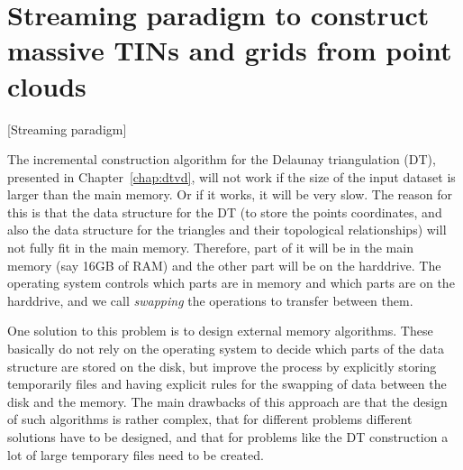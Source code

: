 

%
\section[Streaming paradigm to construct massive TINs/grids]{Streaming paradigm to construct massive TINs and grids from point clouds}[Streaming paradigm]%
\label{sec:streaming}

The incremental construction algorithm for the Delaunay triangulation (DT), presented in Chapter~\ref{chap:dtvd}, will not work if the size of the input dataset is larger than the main memory.
Or if it works, it will be very slow.
The reason for this is that the data structure for the DT (to store the points coordinates, and also the data structure for the triangles and their topological relationships) will not fully fit in the main memory.
Therefore, part of it will be in the main memory (say 16GB of RAM) and the other part will be on the harddrive.
The operating system controls which parts are in memory and which parts are on the harddrive, and we call \emph{swapping} the operations to transfer between them.

%

One solution to this problem is to design external memory algorithms.%
These basically do not rely on the operating system to decide which parts of the data structure are stored on the disk, but improve the process by explicitly storing temporarily files and having explicit rules for the swapping of data between the disk and the memory. 
The main drawbacks of this approach are that the design of such algorithms is rather complex, that for different problems different solutions have to be designed, and that for problems like the DT construction a lot of large temporary files need to be created.

%

